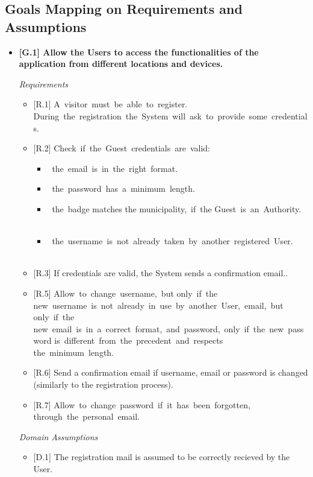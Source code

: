 \documentclass{report}
\begin{document}
\subsection{Goals Mapping on Requirements and Assumptions}
\begin{itemize}
	\item \textbf{{[G.1]} Allow the Users to access the functionalities of the application from different locations and devices.}
\begin{center}\large{\textit{Requirements}}\end{center}
	\begin{itemize}
		\item{[R.1]} 
		A visitor must be able to register. During the registration the System will ask to provide some credentials.
		\item {[R.2]} Check if the Guest credentials are valid:
	        \begin{itemize}
	            \item the email is in the right format.
	            \item the password has a minimum length.
	            \item the badge matches the municipality, if the Guest is an Authority.
	            \item the username is not already taken by another registered User.
	        \end{itemize}
		\item {[R.3]} If credentials are valid, the System sends a confirmation email..
		\item {[R.5]} 
		Allow to change username, but only if the new username is not already in use by another User, email, but only if the\\
		new email is in a correct format, and password, only if the new password is different from the precedent and respects \\ 
		the minimum length.
		\item {[R.6]} Send a confirmation email if username, email or password is changed (similarly to the registration process).
		\item {[R.7]} 
		Allow to change password if it has been forgotten, through the personal email.
	\end{itemize}
\begin{center}\large{\textit{Domain Assumptions}}\end{center}
	\begin{itemize}
		\item {[D.1]} The registration mail is assumed to be correctly recieved by the User.

\end{itemize}
\end{itemize}
\end{document}
